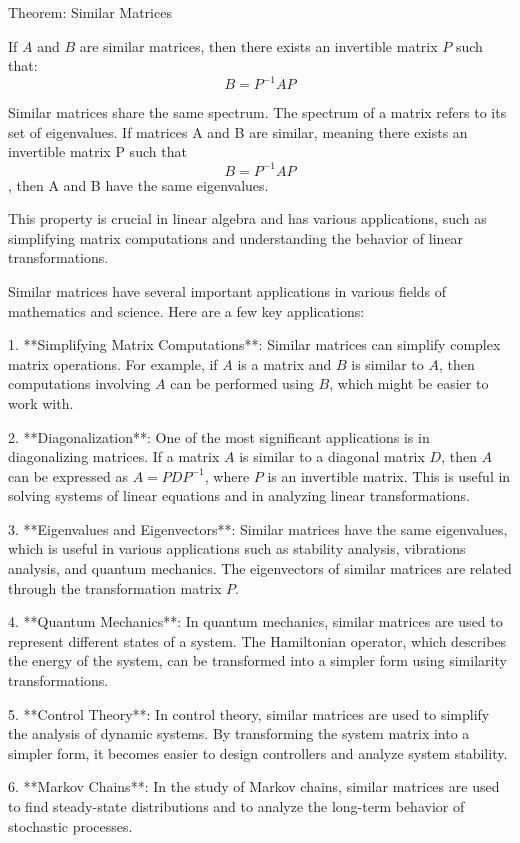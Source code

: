 \documentclass{article}
\begin{document}
 
Theorem: Similar Matrices

If \( A \) and \( B \) are similar matrices, then there exists an invertible matrix \( P \) such that:
\[
B = P^{-1}AP
\]

Similar matrices share the same spectrum. The spectrum of a matrix refers to its set of eigenvalues. If matrices A and B are similar, meaning there exists an invertible matrix P such that 
\[
B = P^{-1}AP
\] , then A and B have the same eigenvalues.

This property is crucial in linear algebra and has various applications, such as simplifying matrix computations and understanding the behavior of linear transformations.

Similar matrices have several important applications in various fields of mathematics and science. Here are a few key applications:

1. **Simplifying Matrix Computations**: Similar matrices can simplify complex matrix operations. For example, if \( A \) is a matrix and \( B \) is similar to \( A \), then computations involving \( A \) can be performed using \( B \), which might be easier to work with.


2. **Diagonalization**: One of the most significant applications is in diagonalizing matrices. If a matrix \( A \) is similar to a diagonal matrix \( D \), then \( A \) can be expressed as \( A = PDP^{-1} \), where \( P \) is an invertible matrix. This is useful in solving systems of linear equations and in analyzing linear transformations.


3. **Eigenvalues and Eigenvectors**: Similar matrices have the same eigenvalues, which is useful in various applications such as stability analysis, vibrations analysis, and quantum mechanics. The eigenvectors of similar matrices are related through the transformation matrix \( P \).

4. **Quantum Mechanics**: In quantum mechanics, similar matrices are used to represent different states of a system. The Hamiltonian operator, which describes the energy of the system, can be transformed into a simpler form using similarity transformations.

5. **Control Theory**: In control theory, similar matrices are used to simplify the analysis of dynamic systems. By transforming the system matrix into a simpler form, it becomes easier to design controllers and analyze system stability.

6. **Markov Chains**: In the study of Markov chains, similar matrices are used to find steady-state distributions and to analyze the long-term behavior of stochastic processes.
\end{document}
